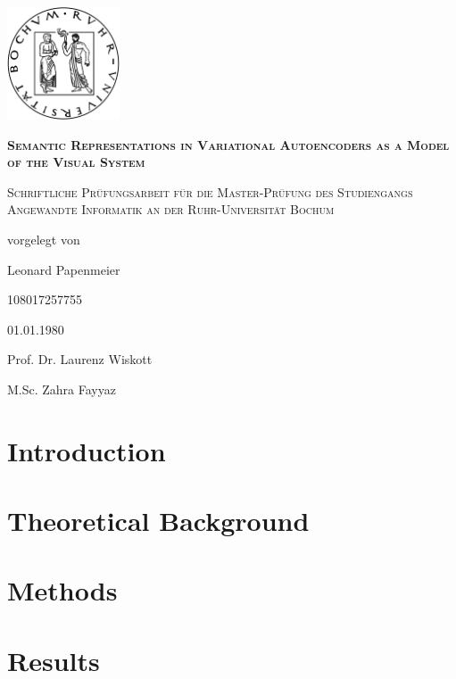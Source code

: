 \documentclass[11pt]{article}
\newcounter{savepage}
\begin{document}
\begin{titlepage}
\centering
\includegraphics[width=0.25\textwidth]{rublogo.png}\par
{\scshape\huge\bfseries Semantic Representations in Variational Autoencoders as a Model of the Visual System \par}
{\scshape\large Schriftliche Prüfungsarbeit für die Master-Prüfung des Studiengangs Angewandte Informatik an der Ruhr-Universität Bochum\par}
\vspace{1em}
vorgelegt von\par
\vspace{2em}
Leonard Papenmeier\par 108017257755\par
\vspace{2em}
01.01.1980\par

\vfill
Prof. Dr. Laurenz Wiskott\par
M.Sc. Zahra Fayyaz


\end{titlepage}
\tableofcontents
\newpage


    \section{Introduction}\label{sec:introduction}


    \section{Theoretical Background}\label{sec:theoretical-background}
    


    \section{Methods}\label{sec:methods}



\section{Results}\label{sec:results}

\end{document}
